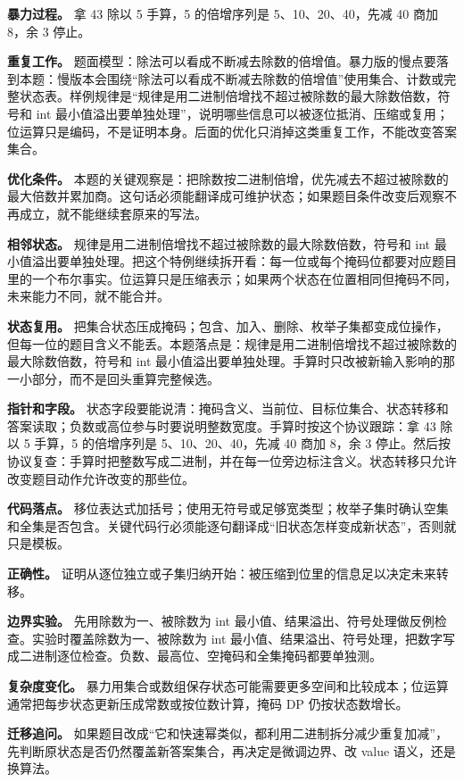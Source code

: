 \textbf{暴力过程。} 拿 43 除以 5 手算，5 的倍增序列是 5、10、20、40，先减 40 商加 8，余 3 停止。

\textbf{重复工作。} 题面模型：除法可以看成不断减去除数的倍增值。暴力版的慢点要落到本题：慢版本会围绕“除法可以看成不断减去除数的倍增值”使用集合、计数或完整状态表。样例规律是“规律是用二进制倍增找不超过被除数的最大除数倍数，符号和 int 最小值溢出要单独处理”，说明哪些信息可以被逐位抵消、压缩或复用；位运算只是编码，不是证明本身。后面的优化只消掉这类重复工作，不能改变答案集合。

\textbf{优化条件。} 本题的关键观察是：把除数按二进制倍增，优先减去不超过被除数的最大倍数并累加商。这句话必须能翻译成可维护状态；如果题目条件改变后观察不再成立，就不能继续套原来的写法。

\textbf{相邻状态。} 规律是用二进制倍增找不超过被除数的最大除数倍数，符号和 int 最小值溢出要单独处理。把这个特例继续拆开看：每一位或每个掩码位都要对应题目里的一个布尔事实。位运算只是压缩表示；如果两个状态在位置相同但掩码不同，未来能力不同，就不能合并。

\textbf{状态复用。} 把集合状态压成掩码；包含、加入、删除、枚举子集都变成位操作，但每一位的题目含义不能丢。本题落点是：规律是用二进制倍增找不超过被除数的最大除数倍数，符号和 int 最小值溢出要单独处理。手算时只改被新输入影响的那一小部分，而不是回头重算完整候选。

\textbf{指针和字段。} 状态字段要能说清：掩码含义、当前位、目标位集合、状态转移和答案读取；负数或高位参与时要说明整数宽度。手算时按这个协议跟踪：拿 43 除以 5 手算，5 的倍增序列是 5、10、20、40，先减 40 商加 8，余 3 停止。然后按协议复查：手算时把整数写成二进制，并在每一位旁边标注含义。状态转移只允许改变题目动作允许改变的那些位。

\textbf{代码落点。} 移位表达式加括号；使用无符号或足够宽类型；枚举子集时确认空集和全集是否包含。关键代码行必须能逐句翻译成“旧状态怎样变成新状态”，否则就只是模板。

\textbf{正确性。} 证明从逐位独立或子集归纳开始：被压缩到位里的信息足以决定未来转移。

\textbf{边界实验。} 先用除数为一、被除数为 int 最小值、结果溢出、符号处理做反例检查。实验时覆盖除数为一、被除数为 int 最小值、结果溢出、符号处理，把数字写成二进制逐位检查。负数、最高位、空掩码和全集掩码都要单独测。

\textbf{复杂度变化。} 暴力用集合或数组保存状态可能需要更多空间和比较成本；位运算通常把每步状态更新压成常数或按位数计算，掩码 DP 仍按状态数增长。

\textbf{迁移追问。} 如果题目改成“它和快速幂类似，都利用二进制拆分减少重复加减”，先判断原状态是否仍然覆盖新答案集合，再决定是微调边界、改 value 语义，还是换算法。

